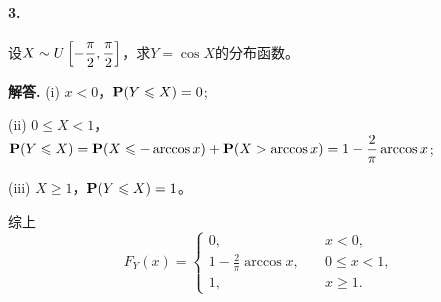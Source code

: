 \documentclass[12pt, a4paper, oneside]{ctexart}
\newenvironment{solution}{\par\noindent\textbf{解答. }}{\bigskip\par}
\begin{document}
\paragraph{3.}设$\disp X\sim U\left[-\frac{\pi}{2},\frac{\pi}{2}\right]$，求$Y=\cos X$的分布函数。
\begin{solution}
(i) $x<0$，$\P(Y\leqslant X) = 0$;

(ii) $0\leqslant X < 1$，$\disp\P(Y\leqslant X) = \P(X \leqslant -\arccos x) + \P(X > \arccos x) = 1-\frac{2}{\pi}\arccos x$;

(iii) $X\geqslant 1$，$\P(Y \leqslant X) = 1$。

综上\begin{equation*}
    F_Y(x) = \begin{cases}
        0,&\quad x < 0,\\
        1-\frac{2}{\pi}\arccos x,&\quad 0\leqslant x < 1,\\
        1,&\quad x \geqslant 1.
    \end{cases}
\end{equation*}
\end{solution}
\end{document}
